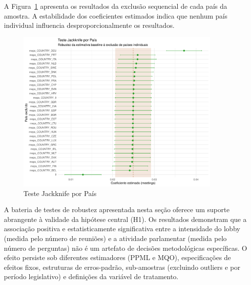 A Figura~\ref{fig:jackknife_country} apresenta os resultados da exclusão sequencial de cada país da amostra. A estabilidade dos coeficientes estimados indica que nenhum país individual influencia desproporcionalmente os resultados.

\begin{figure}[!h]
    \centering
    \includegraphics[width=0.9\textwidth]{figures/robustness/jackknife_country.pdf}
    \caption{Teste Jackknife por País}
    \label{fig:jackknife_country}
\end{figure}


A bateria de testes de robustez apresentada nesta seção oferece um suporte abrangente à validade da hipótese central (H1). Os resultados demonstram que a associação positiva e estatisticamente significativa entre a intensidade do lobby (medida pelo número de reuniões) e a atividade parlamentar (medida pelo número de perguntas) não é um artefato de decisões metodológicas específicas. O efeito persiste sob diferentes estimadores (PPML e MQO), especificações de efeitos fixos, estruturas de erros-padrão, sub-amostras (excluindo outliers e por período legislativo) e definições da variável de tratamento.

